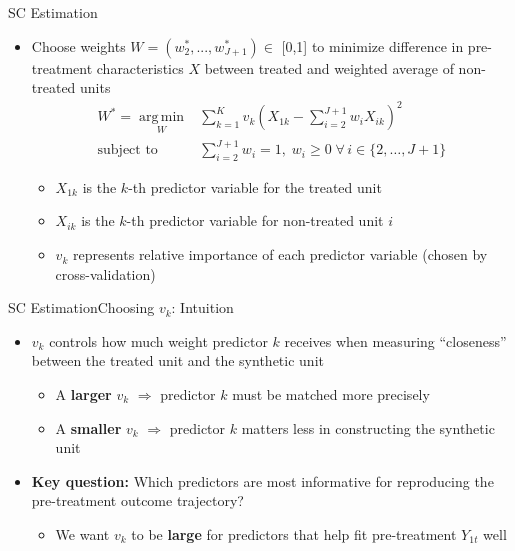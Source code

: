 \documentclass[dvipsnames,hyperref={pdfpagelabels=false}]{beamer}
\DeclareMathOperator*{\argmin}{arg\,min}
\begin{document}
\begin{frame}{SC Estimation}
\begin{itemize}
	\item Choose weights $W=(w^{*}_{2},...,w^{*}_{J+1})$$\in$ [0,1] to minimize difference in pre-treatment characteristics $X$ between treated and weighted average of non-treated units
	\vspace{0.2cm}
	\begin{equation*}
		\begin{aligned}
			W^* = \argmin\limits_{W} & \sum_{k=1}^{K} v_k\left(X_{1k} - \sum_{i=2}^{J+1} w_i X_{ik}\right)^2 \\
			\text{subject to } & \sum_{i=2}^{J+1} w_i = 1, \; w_i \geq 0 \;\forall\, i \in \{2,\ldots,J+1\}
		\end{aligned}
\end{equation*}

\begin{itemize}
	\item $X_{1k}$ is the $k$-th predictor variable for the treated unit
				\vspace{0.2cm}
		\item $X_{ik}$ is the $k$-th predictor variable for non-treated unit $i$
					\vspace{0.2cm}
			\item $v_k$ represents relative importance of each predictor variable (chosen by cross-validation)
\end{itemize}
\end{itemize}
\end{frame}


\begin{frame}{SC Estimation}{Choosing $v_k$: Intuition}
\begin{itemize}
	\item $v_k$ controls how much weight predictor $k$ receives when measuring ``closeness'' between the treated unit and the synthetic unit
	\vspace{0.2cm}
	\begin{itemize}
		\item A \textbf{larger} $v_k$ $\Rightarrow$ predictor $k$ must be matched more precisely
		\vspace{0.2cm}
		\item A \textbf{smaller} $v_k$ $\Rightarrow$ predictor $k$ matters less in constructing the synthetic unit
	\end{itemize}
	\vspace{0.2cm}
	\item \textbf{Key question:} Which predictors are most informative for reproducing the pre-treatment outcome trajectory?
	\vspace{0.2cm}
	\begin{itemize}
		\item We want $v_k$ to be \textbf{large} for predictors that help fit pre-treatment $Y_{1t}$ well
	\end{itemize}
\end{itemize}
\end{frame}
\end{document}
